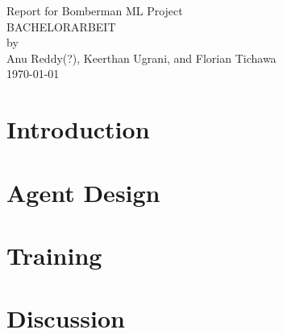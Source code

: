 \documentclass[12pt]{article}
\begin{document}

  \pagestyle{fancy}

  \thispagestyle{empty}
  \begin{center}
    \Large Report for Bomberman ML Project\\[2\baselineskip]
    \large\uppercase{Bachelorarbeit}\\
    by\\
    Anu Reddy(?), Keerthan Ugrani, and Florian Tichawa\\
    [2\baselineskip]
    \today\\
    \vfill
  \end{center}

  \pagebreak
  \tableofcontents

  \pagebreak
  \glsresetall
  \section{Introduction}
  \label{sec:intro}
  

  \section{Agent Design}
  \label{sec:design}
  

  \section{Training}
  \label{sec:training}
  

  \section{Discussion}
  \label{sec:discussion}
  

  \pagebreak
  \printglossaries

  \pagebreak
  \printbibliography
\end{document}

